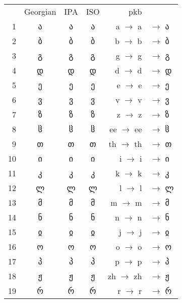 \documentclass{article}
\newcommand\tgeoi[1]{{\geofontipa #1}}
\newcommand\tgeoii[1]{{\geofontiso #1}}
\newcommand\tgeoiii[1]{{\geofontpkb #1}}
\newcommand\textgeo[1]{{\geofont #1}}
\newcommand\textgeom[1]{{\geomfont #1}}
\begin{document}
\uccoff

\begin{tabular}{rcccrl}
 & Georgian & IPA & ISO & pkb & \\
1 & \textgeo{ა}  & \tgeoi{ა} & \tgeoii{ა} & a $\to$ \textgeom{a} &  $\to$ \tgeoiii{ა} \\
2 & \textgeo{ბ}  & \tgeoi{ბ} & \tgeoii{ბ} & b $\to$ \textgeom{b} &  $\to$ \tgeoiii{ბ} \\
3 & \textgeo{გ}  & \tgeoi{გ} & \tgeoii{გ} & g $\to$ \textgeom{g} &  $\to$ \tgeoiii{გ} \\
4 & \textgeo{დ}  & \tgeoi{დ} & \tgeoii{დ} & d $\to$ \textgeom{d} &  $\to$ \tgeoiii{დ} \\
5 & \textgeo{ე}  & \tgeoi{ე} & \tgeoii{ე} & e $\to$ \textgeom{e} &  $\to$ \tgeoiii{ე} \\
6 & \textgeo{ვ}  & \tgeoi{ვ} & \tgeoii{ვ} & v $\to$ \textgeom{v} &  $\to$ \tgeoiii{ვ} \\
7 & \textgeo{ზ}  & \tgeoi{ზ} & \tgeoii{ზ} & z $\to$ \textgeom{z} &  $\to$ \tgeoiii{ზ} \\
8 & \textgeo{ჱ}  & \tgeoi{ჱ} & \tgeoii{ჱ} & ee $\to$ \textgeom{ee} &  $\to$ \tgeoiii{ჱ} \\
9 & \textgeo{თ}  & \tgeoi{თ} & \tgeoii{თ} & th $\to$ \textgeom{th} &  $\to$ \tgeoiii{თ} \\
10 & \textgeo{ი}  & \tgeoi{ი} & \tgeoii{ი} & i $\to$ \textgeom{i} &  $\to$ \tgeoiii{ი} \\
11 & \textgeo{კ}  & \tgeoi{კ} & \tgeoii{კ} & k $\to$ \textgeom{k} &  $\to$ \tgeoiii{კ} \\
12 & \textgeo{ლ}  & \tgeoi{ლ} & \tgeoii{ლ} & l $\to$ \textgeom{l} &  $\to$ \tgeoiii{ლ} \\
13 & \textgeo{მ}  & \tgeoi{მ} & \tgeoii{მ} & m $\to$ \textgeom{m} &  $\to$ \tgeoiii{მ} \\
14 & \textgeo{ნ}  & \tgeoi{ნ} & \tgeoii{ნ} & n $\to$ \textgeom{n} &  $\to$ \tgeoiii{ნ} \\
15 & \textgeo{ჲ}  & \tgeoi{ჲ} & \tgeoii{ჲ} & j $\to$ \textgeom{j} &  $\to$ \tgeoiii{ჲ} \\
16 & \textgeo{ო}  & \tgeoi{ო} & \tgeoii{ო} & o $\to$ \textgeom{o} &  $\to$ \tgeoiii{ო} \\
17 & \textgeo{პ}  & \tgeoi{პ} & \tgeoii{პ} & p $\to$ \textgeom{p} &  $\to$ \tgeoiii{პ} \\
18 & \textgeo{ჟ}  & \tgeoi{ჟ} & \tgeoii{ჟ} & zh $\to$ \textgeom{zh} &  $\to$ \tgeoiii{ჟ} \\
19 & \textgeo{რ}  & \tgeoi{რ} & \tgeoii{რ} & r $\to$ \textgeom{r} &  $\to$ \tgeoiii{რ} \\

\end{tabular}
\end{document}
